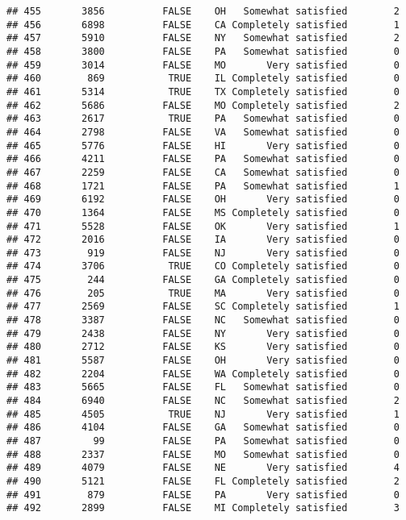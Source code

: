 \documentclass[]{book}
\theoremstyle{definition}
\theoremstyle{definition}
\theoremstyle{remark}
\begin{document}
\begin{verbatim}
## 455       3856          FALSE    OH   Somewhat satisfied        2
## 456       6898          FALSE    CA Completely satisfied        1
## 457       5910          FALSE    NY   Somewhat satisfied        2
## 458       3800          FALSE    PA   Somewhat satisfied        0
## 459       3014          FALSE    MO       Very satisfied        0
## 460        869           TRUE    IL Completely satisfied        0
## 461       5314           TRUE    TX Completely satisfied        0
## 462       5686          FALSE    MO Completely satisfied        2
## 463       2617           TRUE    PA   Somewhat satisfied        0
## 464       2798          FALSE    VA   Somewhat satisfied        0
## 465       5776          FALSE    HI       Very satisfied        0
## 466       4211          FALSE    PA   Somewhat satisfied        0
## 467       2259          FALSE    CA   Somewhat satisfied        0
## 468       1721          FALSE    PA   Somewhat satisfied        1
## 469       6192          FALSE    OH       Very satisfied        0
## 470       1364          FALSE    MS Completely satisfied        0
## 471       5528          FALSE    OK       Very satisfied        1
## 472       2016          FALSE    IA       Very satisfied        0
## 473        919          FALSE    NJ       Very satisfied        0
## 474       3706           TRUE    CO Completely satisfied        0
## 475        244          FALSE    GA Completely satisfied        0
## 476        205           TRUE    MA       Very satisfied        0
## 477       2569          FALSE    SC Completely satisfied        1
## 478       3387          FALSE    NC   Somewhat satisfied        0
## 479       2438          FALSE    NY       Very satisfied        0
## 480       2712          FALSE    KS       Very satisfied        0
## 481       5587          FALSE    OH       Very satisfied        0
## 482       2204          FALSE    WA Completely satisfied        0
## 483       5665          FALSE    FL   Somewhat satisfied        0
## 484       6940          FALSE    NC   Somewhat satisfied        2
## 485       4505           TRUE    NJ       Very satisfied        1
## 486       4104          FALSE    GA   Somewhat satisfied        0
## 487         99          FALSE    PA   Somewhat satisfied        0
## 488       2337          FALSE    MO   Somewhat satisfied        0
## 489       4079          FALSE    NE       Very satisfied        4
## 490       5121          FALSE    FL Completely satisfied        2
## 491        879          FALSE    PA       Very satisfied        0
## 492       2899          FALSE    MI Completely satisfied        3

\end{verbatim}
\end{document}
